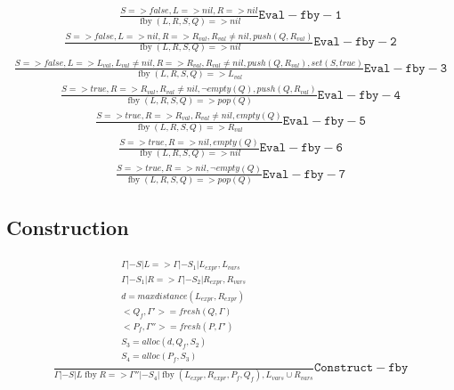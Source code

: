 \documentclass{scrartcl}
\DeclareMathOperator{\fby}{fby}
\begin{document}
    \begin{align*}
    \frac{
        S => false, L => nil, R => nil
    }{
        \fby(L, R, S, Q) => nil
    }\mathtt{Eval-fby-1}
    \end{align*}
    \begin{align*}
    \frac{
        S => false, L => nil, R => R_{val}, R_{val} \neq nil, push(Q, R_{val})
    }{
        \fby(L, R, S, Q) => nil
    }\mathtt{Eval-fby-2}
    \end{align*}
    \begin{align*}
    \frac{
        S => false, L => L_{val}, L_{val} \neq nil, R => R_{val}, R_{val} \neq nil, push(Q, R_{val}), set(S, true)
    }{
        \fby(L, R, S, Q) => L_{val}
    }\mathtt{Eval-fby-3}
    \end{align*}
    \begin{align*}
    \frac{
        S => true, R => R_{val}, R_{val} \neq nil, \lnot empty(Q), push(Q, R_{val})
    }{
        \fby(L, R, S, Q) => pop(Q)
    }\mathtt{Eval-fby-4}
    \end{align*}
    \begin{align*}
    \frac{
        S => true, R => R_{val}, R_{val} \neq nil, empty(Q)
    }{
        \fby(L, R, S, Q) => R_{val}
    }\mathtt{Eval-fby-5}
    \end{align*}
    \begin{align*}
    \frac{
        S => true, R => nil, empty(Q)
    }{
        \fby(L, R, S, Q) => nil
    }\mathtt{Eval-fby-6}
    \end{align*}
    \begin{align*}
    \frac{
        S => true, R => nil, \lnot empty(Q)
    }{
        \fby(L, R, S, Q) => pop(Q)
    }\mathtt{Eval-fby-7}
    \end{align*}
    
    \subsection{Construction}
    
    \begin{align*}
    \frac{
        \begin{matrix}
        \Gamma |- S | L => \Gamma |- S_1 | L_{expr}, L_{vars} \\
        \Gamma |- S_1 | R => \Gamma |- S_2 | R_{expr}, R_{vars} \\
        d = maxdistance(L_{expr}, R_{expr}) \\
        <Q_f, \Gamma'> = fresh(Q, \Gamma) \\
        <P_f, \Gamma''> = fresh(P, \Gamma') \\
        S_3 = alloc(d, Q_f, S_2) \\
        S_4 = alloc(P_f, S_3) \\
        \end{matrix}
    }{
        \Gamma |- S | L \fby R => \Gamma'' |- S_4 | \fby(L_{expr}, R_{expr}, P_f, Q_f), L_{vars} \cup R_{vars}
    }\mathtt{Construct-fby}
    \end{align*}
    
\end{document}
